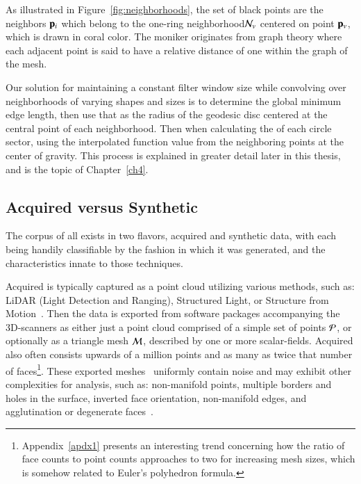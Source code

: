 As illustrated in Figure~\ref{fig:neighborhoods}, the set of black points are the neighbors $\mathbf{p}_i$ which belong to the one-ring neighborhood\footnotemark $\mathcal{N}_v$ centered on point $\mathbf{p}_v$, which is drawn in coral color. The moniker originates from graph theory where each adjacent point is said to have a relative distance of one within the graph of the mesh. 

Our solution for maintaining a constant filter window size while convolving  over neighborhoods of varying shapes and sizes is to determine the global minimum edge length, then use that as the radius of the geodesic disc centered at the central point of each neighborhood. Then when calculating the  of each circle sector, using the interpolated function value from the neighboring points at the center of gravity. This process is explained in greater detail later in this thesis, and is the topic of Chapter~\ref{ch4}.

%
%
%
%
\subsection{Acquired versus Synthetic \tdd{}}
\label{ch2sTDDssAVS3}
The corpus of all \tdd{} exists in two flavors, acquired and synthetic data, with each being handily classifiable by the fashion in which it was generated, and the characteristics innate to those techniques.

Acquired \tdd{} is typically captured as a point cloud utilizing various methods, such as: LiDAR (Light Detection and Ranging), Structured Light, or Structure from Motion~\cite[p.~19]{Mara12}. Then the data is exported from software packages accompanying the 3D-scanners as either just a point cloud comprised of a simple set of points $\mathcal{P}$, or optionally as a triangle mesh $\mathcal{M}$, described by one or more scalar-fields. Acquired \tdd{} also often consists upwards of a million points and as many as twice that number of faces\footnote{Appendix~\ref{apdx1} presents an interesting trend concerning how the ratio of face counts to point counts approaches to two for increasing mesh sizes, which is somehow related to Euler's polyhedron formula.}. These exported meshes~\cite[p.~25]{Mara12} uniformly contain noise and may exhibit other complexities for analysis, such as: non-manifold points, multiple borders and holes in the surface, inverted face orientation, non-manifold edges, and agglutination or degenerate faces~\cite[p.~28-32]{Mara12}.

